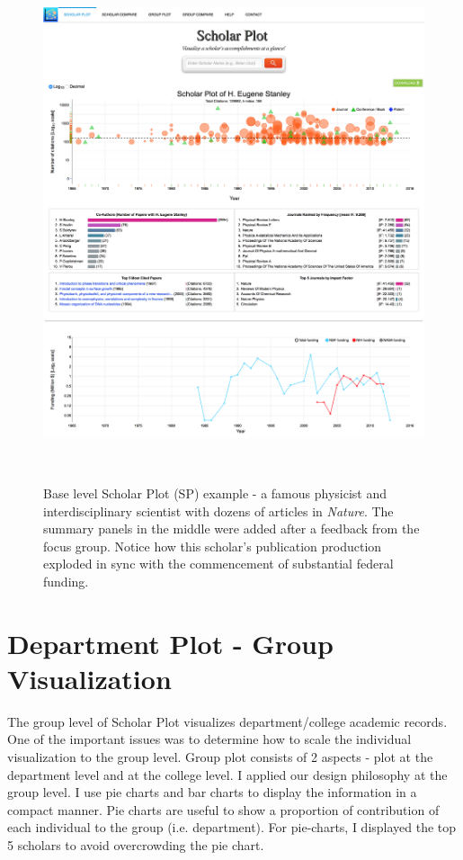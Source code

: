 \begin{figure}
    \centering
    \includegraphics[width=1\textwidth]{figures/fig-Eugene-with-menu}
    \caption{Base level Scholar Plot (SP) example - a famous physicist and interdisciplinary scientist with dozens of articles in \emph{Nature}. The summary panels in the middle were added after a feedback from the focus group. Notice how this scholar's publication production exploded in sync with the commencement of substantial federal funding.}~\label{fig-scholarplot-full}
\end{figure}





\section{Department Plot - Group Visualization}
The group level of Scholar Plot visualizes department/college academic records. One of the important issues was to determine how to scale the individual visualization to the group level. Group plot consists of 2 aspects - plot at the department level and at the college level. I applied our design philosophy at the group level. I use pie charts and bar charts to display the information in a compact manner. Pie charts are useful to show a proportion of contribution of each individual to the group (i.e. department). For pie-charts, I displayed the top 5 scholars to avoid overcrowding the pie chart.

